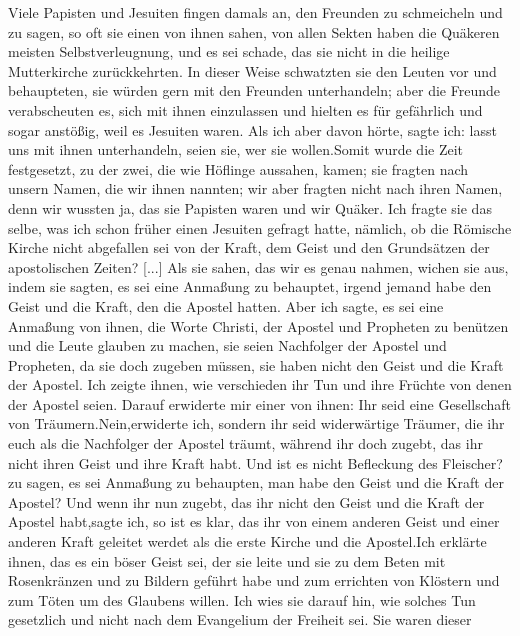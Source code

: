 Viele Papisten und Jesuiten fingen damals an, den Freunden
zu schmeicheln und zu sagen, so oft sie einen von ihnen sahen,
von allen Sekten haben die Quäkeren meisten Selbstverleugnung,
und es sei schade, das sie nicht in die heilige Mutterkirche 
zurückkehrten. In dieser Weise schwatzten sie den Leuten vor und 
behaupteten, sie würden gern mit den Freunden unterhandeln; aber
die Freunde verabscheuten es, sich mit ihnen einzulassen und
hielten es für gefährlich und sogar anstößig, weil es Jesuiten
waren. Als ich aber davon hörte, sagte ich: \glqq lasst uns mit ihnen
unterhandeln, seien sie, wer sie wollen.\grqq Somit wurde die Zeit
festgesetzt, zu der zwei, die wie Höflinge aussahen, kamen; sie
fragten nach unsern Namen, die wir ihnen nannten; wir aber
fragten nicht nach ihren Namen, denn wir wussten ja, das sie
Papisten waren und wir Quäker. Ich fragte sie das selbe, was
ich schon früher einen Jesuiten gefragt hatte, nämlich, ob die
Römische Kirche nicht abgefallen sei von der Kraft, dem Geist
und den Grundsätzen der apostolischen Zeiten? [...] Als sie
sahen, das wir es genau nahmen, wichen sie aus, indem sie sagten,
es sei eine Anmaßung zu behauptet, irgend jemand habe den
Geist und die Kraft, den die Apostel hatten. Aber ich sagte, es
sei eine Anmaßung von ihnen, die Worte Christi, der Apostel und
Propheten zu benützen und die Leute glauben zu machen, sie seien
Nachfolger der Apostel und Propheten, da sie doch zugeben müssen,
sie haben nicht den Geist und die Kraft der Apostel. Ich zeigte
ihnen, wie verschieden ihr Tun und ihre Früchte von denen der
Apostel seien. Darauf erwiderte mir einer von ihnen: \glqq Ihr seid
eine Gesellschaft von Träumern.\grqq \glqq Nein,\grqq erwiderte ich, 
\glqq sondern ihr seid widerwärtige Träumer, die ihr euch als die 
Nachfolger der Apostel träumt, während ihr doch zugebt, das ihr nicht ihren
Geist und ihre Kraft habt. Und ist es nicht Befleckung des Fleischer?
zu sagen, es sei Anmaßung zu behaupten, man habe den Geist
und die Kraft der Apostel? Und wenn ihr nun zugebt, das ihr
nicht den Geist und die Kraft der Apostel habt,\grqq sagte ich, \glqq 
so ist es klar, das ihr von einem anderen Geist und einer anderen
Kraft geleitet werdet als die erste Kirche und die Apostel.\grqq Ich
erklärte ihnen, das es ein böser Geist sei, der sie leite und sie zu
dem Beten mit Rosenkränzen und zu Bildern geführt habe und
zum errichten von Klöstern  und zum Töten um des Glaubens
willen. Ich wies sie darauf hin, wie solches Tun gesetzlich und
nicht nach dem Evangelium der Freiheit sei. Sie waren dieser
